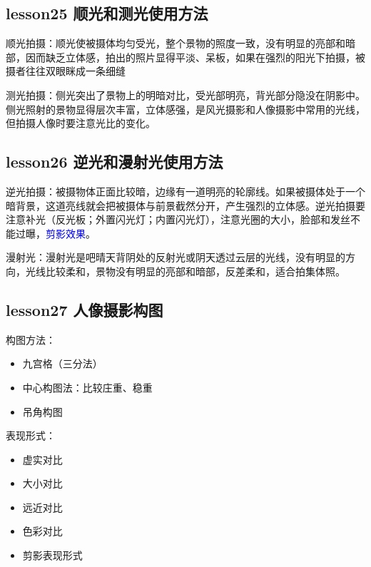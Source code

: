 \documentclass{book}
\begin{document}
\subsection{lesson25 顺光和测光使用方法}

顺光拍摄：顺光使被摄体均匀受光，整个景物的照度一致，没有明显的亮部和暗部，因而缺乏立体感，拍出的照片显得平淡、呆板，如果在强烈的阳光下拍摄，被摄者往往双眼眯成一条细缝

测光拍摄：侧光突出了景物上的明暗对比，受光部明亮，背光部分隐没在阴影中。侧光照射的景物显得层次丰富，立体感强，是风光摄影和人像摄影中常用的光线，但拍摄人像时要注意光比的变化。

\subsection{lesson26 逆光和漫射光使用方法}

逆光拍摄：被摄物体正面比较暗，边缘有一道明亮的轮廓线。如果被摄体处于一个暗背景，这道亮线就会把被摄体与前景截然分开，产生强烈的立体感。逆光拍摄要注意补光（反光板；外置闪光灯；内置闪光灯），注意光圈的大小，脸部和发丝不能过曝，\textcolor{blue}{剪影效果}。

漫射光：漫射光是吧晴天背阴处的反射光或阴天透过云层的光线，没有明显的方向，光线比较柔和，景物没有明显的亮部和暗部，反差柔和，适合拍集体照。

\subsection{lesson27 人像摄影构图}


构图方法：\begin{itemize}
       \item 九宫格（三分法）
       \item 中心构图法：比较庄重、稳重
       \item 吊角构图
     \end{itemize}

表现形式：\begin{itemize}
       \item 虚实对比
       \item 大小对比
       \item 远近对比
       \item 色彩对比
       \item 剪影表现形式
     \end{itemize}
     
\end{document}
